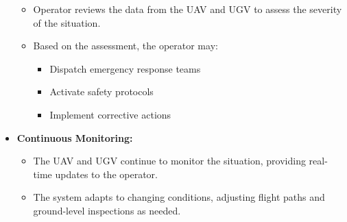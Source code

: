 \begin{itemize}
    \begin{itemize}
        \item Operator reviews the data from the UAV and UGV to assess the severity of the situation.
        \item Based on the assessment, the operator may:
        \begin{itemize}
            \item Dispatch emergency response teams
            \item Activate safety protocols
            \item Implement corrective actions
        \end{itemize}
    \end{itemize}
    \item \textbf{Continuous Monitoring:}
    \begin{itemize}
        \item The UAV and UGV continue to monitor the situation, providing real-time updates to the operator.
        \item The system adapts to changing conditions, adjusting flight paths and ground-level inspections as needed.
    \end{itemize}
\end{itemize}
